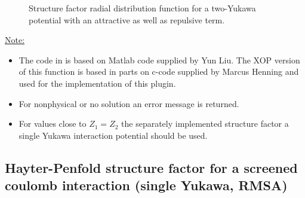 \begin{figure}[htb]
\captionsetup[subfigure]{position=b}
\centering
{}
\hfill
{}
\caption{Structure factor radial distribution function for a two-Yukawa potential with an attractive as well as repulsive term.}
\label{fig:Yukawa}
\end{figure}

\noindent\uline{Note:}
\begin{itemize}
  \item The code in \SASfit is based on Matlab code supplied by Yun Liu. The XOP version of this function is based in parts on c-code supplied by Marcus Henning and used for the implementation of this plugin.
  \item For nonphysical or no solution an error message is returned.
  \item For values close to $Z_1=Z_2$ the separately implemented structure factor a single Yukawa interaction potential should be used.
\end{itemize} 

\subsection{Hayter-Penfold structure factor for a screened coulomb interaction (single Yukawa, RMSA)} 

